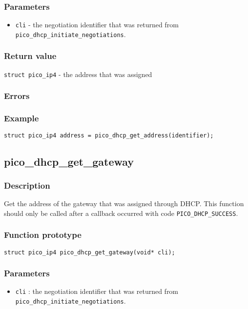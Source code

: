 \subsubsection*{Parameters}
\begin{itemize}
\item \texttt{cli} - the negotiation identifier that was returned from \texttt{pico\_dhcp\_initiate\_negotiations}.
\end{itemize}

\subsubsection*{Return value}
\texttt{struct pico\_ip4} - the address that was assigned

\subsubsection*{Errors}

\subsubsection*{Example}
\begin{verbatim}
struct pico_ip4 address = pico_dhcp_get_address(identifier);
\end{verbatim}


\subsection{pico\_dhcp\_get\_gateway}

\subsubsection*{Description}
Get the address of the gateway that was assigned through DHCP. This function should only be called after a callback occurred with code \texttt{PICO\_DHCP\_SUCCESS}. 

\subsubsection*{Function prototype}
\texttt{struct pico\_ip4 pico\_dhcp\_get\_gateway(void* cli);}

\subsubsection*{Parameters}
\begin{itemize}
\item \texttt{cli} : the negotiation identifier that was returned from \texttt{pico\_dhcp\_initiate\_negotiations}.
\end{itemize}

